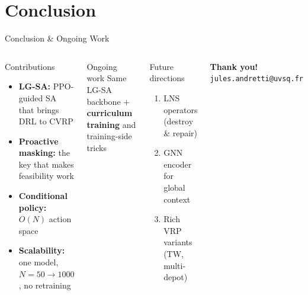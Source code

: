 \documentclass{beamer}
\newcommand{\good}[1]{\textcolor{mygreen!60!black}{\textbf{#1}}}
\begin{document}
\section{Conclusion}

\begin{frame}{Conclusion \& Ongoing Work}
  \begin{columns}[T]
    \begin{block}{Contributions}
      \small
      \begin{itemize}\itemsep2pt
        \item \good{LG-SA:} PPO-guided SA that brings DRL to CVRP
        \item \good{Proactive masking:} the key that makes feasibility work
        \item \good{Conditional policy:} $O(N)$ action space
        \item \good{Scalability:} one model, $N=50 \to 1000$, no retraining
      \end{itemize}
    \end{block}
    \vspace{0.3em}
    \begin{exampleblock}{Ongoing work}
      \small Same LG-SA backbone $+$ \textbf{curriculum training} and training-side tricks%
    \end{exampleblock}

    \begin{alertblock}{Future directions}
      \small
      \begin{enumerate}\itemsep2pt
        \item LNS operators (destroy \& repair)
        \item GNN encoder for global context
        \item Rich VRP variants (TW, multi-depot)
      \end{enumerate}
    \end{alertblock}
    \vspace{1.5em}
    \begin{center}
      \Large\textbf{Thank you!}\\[0.4em]
      \normalsize\texttt{jules.andretti@uvsq.fr}
    \end{center}
  \end{columns}
\end{frame}
\end{document}
